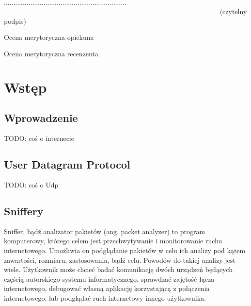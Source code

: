 \documentclass[a4paper, 12pt, twoside, openright]{article}
\begin{document}
\begin{center}

~~~~~~~~~~~~~~~~~~~~~~~~~~~~~~~~~~~~~~~~~~~~~~~~~~~~~~~~~~~~~~~~~ 
................................................................. \\
~~~~~~~~~~~~~~~~~~~~~~~~~~~~~~~~~~~~~~~~~~~~~~~~~~~~~~~~~~~~~~~  {\sf (czytelny podpis)} \\

\end{center}



\newpage
\linespread{1.3}
\selectfont

\hspace*{\fill}\large{Ocena merytoryczna opiekuna}

\vspace{85mm}

\newpage
\linespread{1.3}
\selectfont

\hspace*{\fill}\large{Ocena merytoryczna recenzenta}

\vspace{85mm}


\newpage
\tableofcontents


\newpage
\section{Wstęp}


	\subsection{Wprowadzenie}
	TODO: coś o internecie
	\subsection{User Datagram Protocol}
	TODO: coś o Udp
	\subsection{Sniffery}
	\indent\par
	Sniffer, bądź analizator pakietów (ang. packet analyzer) to program komputerowy, którego celem jest przechwytywanie
	i monitorowanie ruchu internetowego. Umożliwia on
	podglądanie pakietów w celu ich analizy pod kątem zawartości, rozmiaru, zastosowania, bądź celu. Powodów do takiej
	analizy jest wiele. Użytkownik może chcieć badać komunikację dwóch urządzeń będących częścią autorskiego systemu
	informatycznego, sprawdzać zajętość łącza internetowego, debugować własną aplikację korzystającą z połączenia internetowego,
	lub podglądać ruch internetowy innego użytkownika.
\end{document}
